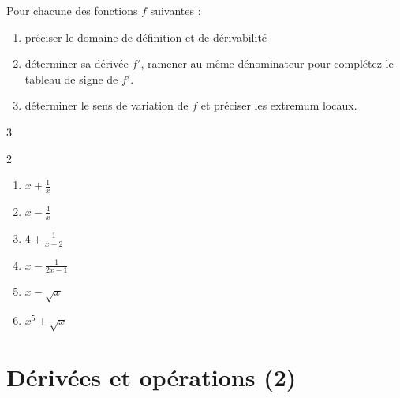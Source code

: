 \documentclass[main.tex]{subfiles}
\begin{document}
\begin{exercise} \label{chapter06:exercice:derivation:operation09}
	Pour chacune des fonctions $f$ suivantes :
	\begin{enumerate}[leftmargin=*,label={\textbullet}]
		\item préciser le domaine de définition et de dérivabilité
		\item déterminer sa dérivée $f'$, ramener au même dénominateur pour complétez le tableau de signe de $f'$.
		\item déterminer le sens de variation de $f$ et préciser les extremum locaux.
	\end{enumerate} 
	\vspace{-1em}
	\begin{multicols}{3}
		\begin{spacing}{2} 
			\begin{enumerate}[label={\arabic*)$f(x)=$}, leftmargin=*]
				\item $x+\frac{1}{x}$ 
				\item $x-\frac{4}{x}$ 
				\item $4+\frac{1}{x-2}$ 
				\item $x-\frac{1}{2x-1}$  
				\item $x-\sqrt{x}$ 
				\item $x^5+\sqrt{x}$ 
			\end{enumerate} 
		\end{spacing}
	\end{multicols}  
\end{exercise}

%	 
\newpage 
{}  
\pagestyle{scrheadings} %
\onehalfspacing
\section{Dérivées et opérations (2)}
 
\end{document}
